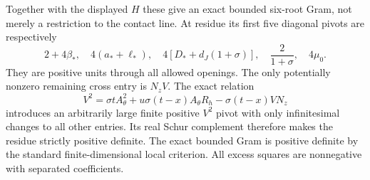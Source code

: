 Together with the displayed $H$ these give an exact bounded six-root Gram,
not merely a restriction to the contact line. At residue its first five
diagonal pivots are respectively
\[
2+4\beta_*,\quad4(a_*+\ell_*),\quad
4[D_*+d_J(1+\sigma)],\quad \frac2{1+\sigma},\quad4\mu_0.
\]
They are positive units through all allowed openings. The only potentially
nonzero remaining cross entry is $N_zV$. The exact relation
\[
 V^2=\sigma tA_\theta^2+u\sigma(t-x)A_\theta R_h
       -\sigma(t-x)VN_z
\]
introduces an arbitrarily large finite positive $V^2$ pivot with only
infinitesimal changes to all other entries. Its real Schur complement
therefore makes the residue strictly positive definite. The exact bounded
Gram is positive definite by the standard finite-dimensional local
criterion. All excess squares are nonnegative with separated coefficients.


